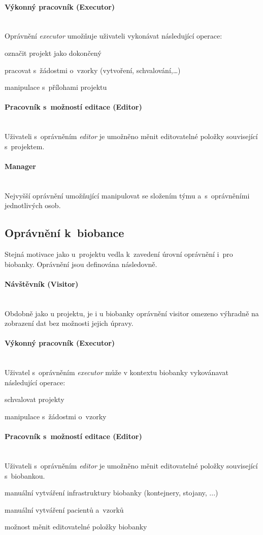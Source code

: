 \documentclass[11pt,draft,oneside]{fithesis2}
\newcommand{\paragraphNewLine}[1]{\paragraph*{#1}\mbox{}\\}
\begin{document}
\paragraphNewLine{Výkonný pracovník (Executor)} 
Oprávnění \textit{executor} umožňuje uživateli vykonávat následující operace:
\begin{compactitem}
	\item označit projekt jako dokončený
	\item pracovat s~žádostmi o~vzorky (vytvoření, schvalování,\ldots)
	\item manipulace s~přílohami projektu
\end{compactitem}

\paragraphNewLine{Pracovník s~možností editace (Editor)}
Uživateli s~oprávněním \textit{editor} je umožněno měnit editovatelné položky související s~projektem.

\paragraphNewLine{Manager}
Nejvyšší oprávnění umožňující manipulovat se složením týmu a~s~oprávněními jednotlivých osob.

\subsection{Oprávnění k~biobance}
Stejná motivace jako u~projektu vedla k~zavedení úrovní oprávnění i~pro biobanky. Oprávnění jsou definována následovně. 

\paragraphNewLine{Návštěvník (Visitor)} 
Obdobně jako u projektu, je i u biobanky oprávnění visitor omezeno výhradně na zobrazení dat bez možnosti jejich úpravy. 

\paragraphNewLine{Výkonný pracovník (Executor)}
Uživatel s~oprávněním \textit{executor} může v kontextu biobanky vykovánavat následující operace:
\begin{compactitem}
	\item schvalovat projekty
	\item manipulace s~žádostmi o~vzorky
\end{compactitem}

\paragraphNewLine{Pracovník s~možností editace (Editor)} 
Uživateli s~oprávněním \textit{editor} je umožněno měnit editovatelné položky související s~biobankou.
\begin{compactitem}
	\item manuální vytváření infrastruktury biobanky (kontejnery, stojany, ...)
	\item manuální vytváření pacientů a~vzorků
	\item možnost měnit editovatelné položky biobanky
\end{compactitem}
\end{document}
